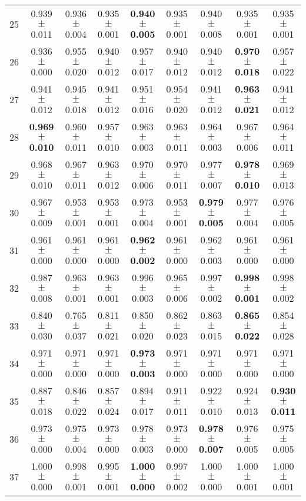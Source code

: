\begin{table}[!ht]
{\begin{tabular}{r c c c c c c c c}
25 & 0.939 $\pm$ 0.011 & 0.936 $\pm$ 0.004 & 0.935 $\pm$ 0.001 & \textbf{0.940 $\pm$ 0.005} & 0.935 $\pm$ 0.001 & 0.940 $\pm$ 0.008 & 0.935 $\pm$ 0.001 & 0.935 $\pm$ 0.001 \\
26 & 0.936 $\pm$ 0.000 & 0.955 $\pm$ 0.020 & 0.940 $\pm$ 0.012 & 0.957 $\pm$ 0.017 & 0.940 $\pm$ 0.012 & 0.940 $\pm$ 0.012 & \textbf{0.970 $\pm$ 0.018} & 0.957 $\pm$ 0.022 \\
27 & 0.941 $\pm$ 0.012 & 0.945 $\pm$ 0.018 & 0.941 $\pm$ 0.012 & 0.951 $\pm$ 0.016 & 0.954 $\pm$ 0.020 & 0.941 $\pm$ 0.012 & \textbf{0.963 $\pm$ 0.021} & 0.941 $\pm$ 0.012 \\
28 & \textbf{0.969 $\pm$ 0.010} & 0.960 $\pm$ 0.011 & 0.957 $\pm$ 0.010 & 0.963 $\pm$ 0.003 & 0.963 $\pm$ 0.011 & 0.964 $\pm$ 0.003 & 0.967 $\pm$ 0.006 & 0.964 $\pm$ 0.011 \\
29 & 0.968 $\pm$ 0.010 & 0.967 $\pm$ 0.011 & 0.963 $\pm$ 0.012 & 0.970 $\pm$ 0.006 & 0.970 $\pm$ 0.011 & 0.977 $\pm$ 0.007 & \textbf{0.978 $\pm$ 0.010} & 0.969 $\pm$ 0.013 \\
30 & 0.967 $\pm$ 0.009 & 0.953 $\pm$ 0.001 & 0.953 $\pm$ 0.001 & 0.973 $\pm$ 0.004 & 0.953 $\pm$ 0.001 & \textbf{0.979 $\pm$ 0.005} & 0.977 $\pm$ 0.004 & 0.976 $\pm$ 0.005 \\
31 & 0.961 $\pm$ 0.000 & 0.961 $\pm$ 0.000 & 0.961 $\pm$ 0.000 & \textbf{0.962 $\pm$ 0.002} & 0.961 $\pm$ 0.000 & 0.962 $\pm$ 0.003 & 0.961 $\pm$ 0.000 & 0.961 $\pm$ 0.000 \\
32 & 0.987 $\pm$ 0.008 & 0.963 $\pm$ 0.001 & 0.963 $\pm$ 0.001 & 0.996 $\pm$ 0.003 & 0.965 $\pm$ 0.006 & 0.997 $\pm$ 0.002 & \textbf{0.998 $\pm$ 0.001} & 0.998 $\pm$ 0.002 \\
33 & 0.840 $\pm$ 0.030 & 0.765 $\pm$ 0.037 & 0.811 $\pm$ 0.021 & 0.850 $\pm$ 0.020 & 0.862 $\pm$ 0.023 & 0.863 $\pm$ 0.015 & \textbf{0.865 $\pm$ 0.022} & 0.854 $\pm$ 0.028 \\
34 & 0.971 $\pm$ 0.000 & 0.971 $\pm$ 0.000 & 0.971 $\pm$ 0.000 & \textbf{0.973 $\pm$ 0.003} & 0.971 $\pm$ 0.000 & 0.971 $\pm$ 0.000 & 0.971 $\pm$ 0.000 & 0.971 $\pm$ 0.000 \\
35 & 0.887 $\pm$ 0.018 & 0.846 $\pm$ 0.022 & 0.857 $\pm$ 0.024 & 0.894 $\pm$ 0.017 & 0.911 $\pm$ 0.011 & 0.922 $\pm$ 0.010 & 0.924 $\pm$ 0.013 & \textbf{0.930 $\pm$ 0.011} \\
36 & 0.973 $\pm$ 0.000 & 0.975 $\pm$ 0.004 & 0.973 $\pm$ 0.000 & 0.978 $\pm$ 0.003 & 0.973 $\pm$ 0.000 & \textbf{0.978 $\pm$ 0.007} & 0.976 $\pm$ 0.005 & 0.975 $\pm$ 0.005 \\
37 & 1.000 $\pm$ 0.000 & 0.998 $\pm$ 0.001 & 0.995 $\pm$ 0.001 & \textbf{1.000 $\pm$ 0.000} & 0.997 $\pm$ 0.002 & 1.000 $\pm$ 0.000 & 1.000 $\pm$ 0.001 & 1.000 $\pm$ 0.001 \\

\end{tabular}}
\end{table}
